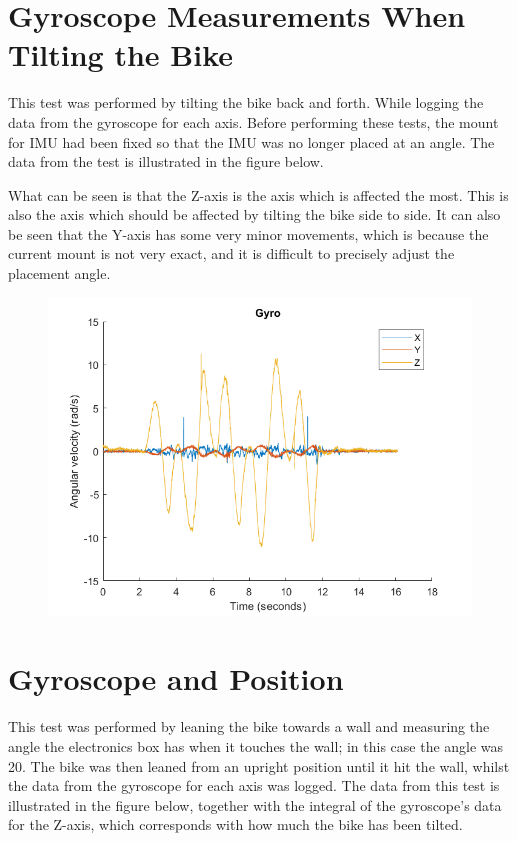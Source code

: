 \newpage

\section{Gyroscope Measurements When Tilting the Bike}

This test was performed by tilting the bike back and forth. While logging the data from the gyroscope for each axis. Before performing these tests, the mount for IMU had been fixed so that the IMU was no longer placed at an angle. The data from the test is illustrated in the figure below. 

What can be seen is that the Z-axis is the axis which is affected the most. This is also the axis which should be affected by tilting the bike side to side. It can also be seen that the Y-axis has some very minor movements, which is because the current mount is not very exact, and it is difficult to precisely adjust the placement angle.

\begin{figure}[h]
    \centering
    \includegraphics[width=\textwidth]{figure/gyroAlignmentTest.png}
\end{figure}

\newpage

\section{Gyroscope and Position}

This test was performed by leaning the bike towards a wall and measuring the angle the electronics box has when it touches the wall; in this case the angle was 20\degree. The bike was then leaned from an upright position until it hit the wall, whilst the data from the gyroscope for each axis was logged. The data from this test is illustrated in the figure below, together with the integral of the gyroscope's data for the Z-axis, which corresponds with how much the bike has been tilted.

